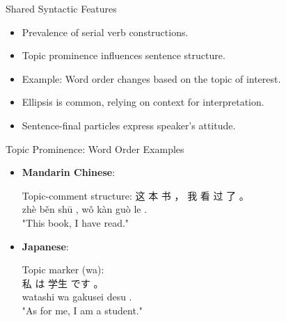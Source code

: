 \documentclass{beamer}
\begin{document}
\begin{frame}{Shared Syntactic Features}
    \begin{itemize}
        \item Prevalence of serial verb constructions.
        \item Topic prominence influences sentence structure.
        \item Example: Word order changes based on the topic of interest.
        \item Ellipsis is common, relying on context for interpretation.
        \item Sentence-final particles express speaker's attitude.
    \end{itemize}
\end{frame}
\begin{frame}{Topic Prominence: Word Order Examples}
    \begin{itemize}
        \item \textbf{Mandarin Chinese}:
            \begin{exe}
                \ex Topic-comment structure: 
                \gll 这 本 书 ， 我 看 过 了 。 \\
                 zhè běn shū , wǒ kàn guò le . \\
                \glt "This book, I have read."
            \end{exe}
        \item \textbf{Japanese}:
          \begin{exe}
            \ex Topic marker  (wa): \\
            \gll 私 は 学生 です 。 \\
            watashi wa gakusei desu . \\
            \glt "As for me, I am a student."
          \end{exe}
    \end{itemize}
\end{frame}
\end{document}
